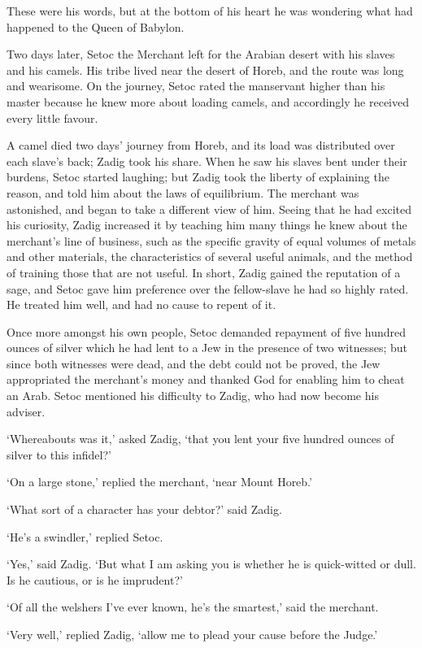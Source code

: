 \documentclass{article}
\begin{document}
\begin{center}
These were his words, but at the bottom of his heart he was wondering what had 
happened to the Queen of Babylon. 

Two days later, Setoc the Merchant left for the Arabian desert with his slaves 
and his camels. His tribe lived near the desert of Horeb, and the route was long 
and wearisome. On the journey, Setoc rated the manservant higher than his master 
because he knew more about loading camels, and accordingly he received every little 
favour. 

A camel died two days' journey from Horeb, and its load was distributed over each 
slave's back; Zadig took his share. When he saw his slaves bent under their burdens, 
Setoc started laughing; but Zadig took the liberty of explaining the reason, and 
told him about the laws of equilibrium. The merchant was astonished, and began 
to take a different view of him. Seeing that he had excited his curiosity, Zadig 
increased it by teaching him many things he knew about the merchant's line of business, 
such as the specific gravity of equal volumes of metals and other materials, the 
characteristics of several useful animals, and the method of training those that 
are not useful. In short, Zadig gained the reputation of a sage, and Setoc gave 
him preference over the fellow-slave he had so highly rated. He treated him well, 
and had no cause to repent of it. 

Once more amongst his own people, Setoc demanded repayment of five hundred ounces 
of silver which he had lent to a Jew in the presence of two witnesses; but since 
both witnesses were dead, and the debt could not be proved, the Jew appropriated 
the merchant's money and thanked God for enabling him to cheat an Arab. Setoc mentioned 
his difficulty to Zadig, who had now become his adviser. 

`Whereabouts was it,' asked Zadig, `that you lent your five hundred ounces of silver 
to this infidel?' 

`On a large stone,' replied the merchant, `near Mount Horeb.' 

`What sort of a character has your debtor?' said Zadig. 

`He's a swindler,' replied Setoc. 

`Yes,' said Zadig. `But what I am asking you is whether he is quick-witted or dull. 
Is he cautious, or is he imprudent?' 

`Of all the welshers I've ever known, he's the smartest,' said the merchant. 

`Very well,' replied Zadig, `allow me to plead your cause before the Judge.' 


\end{center}
\end{document}
